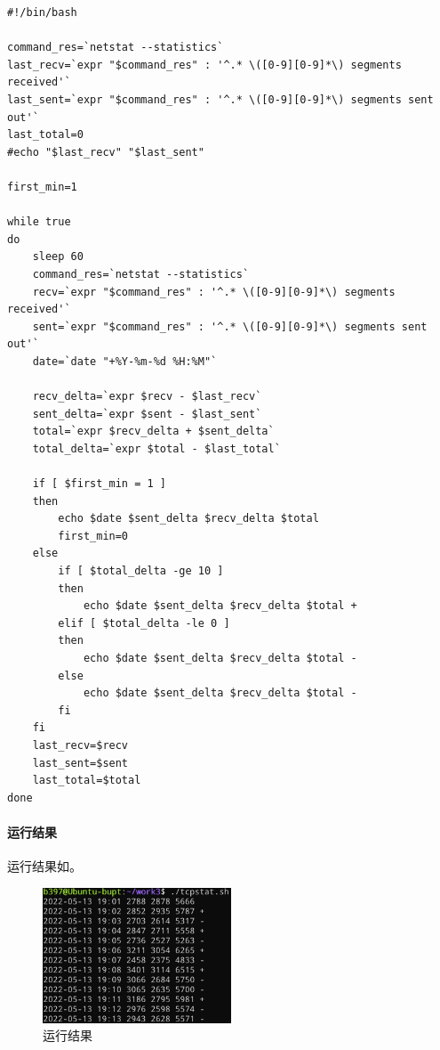 \documentclass[lang=cn,11pt,a4paper,cite=authornum]{paper}
\begin{document}
\begin{code}
\begin{verbatim}
#!/bin/bash

command_res=`netstat --statistics`
last_recv=`expr "$command_res" : '^.* \([0-9][0-9]*\) segments received'`
last_sent=`expr "$command_res" : '^.* \([0-9][0-9]*\) segments sent out'`
last_total=0
#echo "$last_recv" "$last_sent"

first_min=1

while true
do
    sleep 60
    command_res=`netstat --statistics`
    recv=`expr "$command_res" : '^.* \([0-9][0-9]*\) segments received'`
    sent=`expr "$command_res" : '^.* \([0-9][0-9]*\) segments sent out'`
    date=`date "+%Y-%m-%d %H:%M"`
    
    recv_delta=`expr $recv - $last_recv`
    sent_delta=`expr $sent - $last_sent`
    total=`expr $recv_delta + $sent_delta`
    total_delta=`expr $total - $last_total`

    if [ $first_min = 1 ]
    then
        echo $date $sent_delta $recv_delta $total
        first_min=0
    else
        if [ $total_delta -ge 10 ]
        then
            echo $date $sent_delta $recv_delta $total +
        elif [ $total_delta -le 0 ]
        then
            echo $date $sent_delta $recv_delta $total -
        else
            echo $date $sent_delta $recv_delta $total -
        fi
    fi
    last_recv=$recv
    last_sent=$sent
    last_total=$total
done
\end{verbatim}
\end{code}

\paragraph{运行结果}

运行结果如。

\begin{figure}[!htb]
    \centering
    \includegraphics[width=0.5\textwidth]{./images/l3-p2.jpg}
    \caption{运行结果\label{fig:p2}}
\end{figure}
\end{document}
